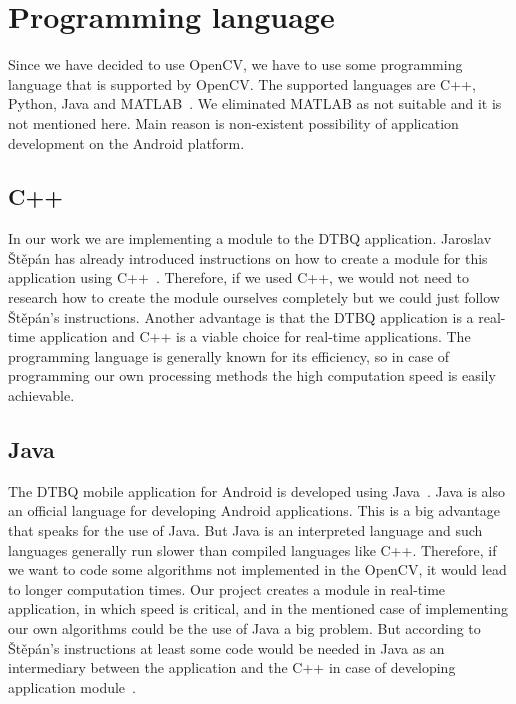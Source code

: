 \documentclass[thesis=B,english]{FITthesis}[2019/12/23]
\begin{document}
        \section{Programming language}
            Since we have decided to use OpenCV, we have to use some programming language that is supported by OpenCV. The supported languages are C++, Python, Java and MATLAB~\cite{aboutOpenCV}. We eliminated MATLAB as not suitable and it is not mentioned here. Main reason is non-existent possibility of application development on the Android platform.

            \subsection{C++}
                In our work we are implementing a module to the DTBQ application. Jaroslav Štěpán has already introduced instructions on how to create a module for this application using C++~\cite{Stepan2019}. Therefore, if we used C++, we would not need to research how to create the module ourselves completely but we could just follow Štěpán’s instructions. Another advantage is that the DTBQ application is a real-time application and C++ is a viable choice for real-time applications. The programming language is generally known for its efficiency, so in case of programming our own processing methods the high computation speed is easily achievable.

            \subsection{Java}
                The DTBQ mobile application for Android is developed using Java~\cite{Stepan2019}. Java is also an official language for developing Android applications. This is a big advantage that speaks for the use of Java. But Java is an interpreted language and such languages generally run slower than compiled languages like C++. Therefore, if we want to code some algorithms not implemented in the OpenCV, it would lead to longer computation times. Our project creates a module in real-time application, in which speed is critical, and in the mentioned case of implementing our own algorithms could be the use of Java a big problem. But according to Štěpán's instructions at least some code would be needed in Java as an intermediary between the application and the C++ in case of developing application module~\cite{Stepan2019}.
                
\end{document}
